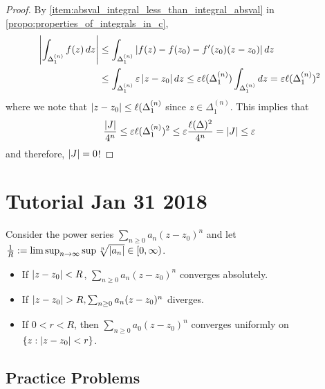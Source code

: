 \documentclass[11pt, oneside]{book}
\begin{document}
\begin{proof}
	By \cref{item:absval_integral_less_than_integral_absval} in \cref{propo:properties_of_integrals_in_c},
	\begin{align*}
		\left|\int_{\Delta_1^{(n)}} f(z) \mathop{}\!d{z}\right|
			&\leq \int_{\Delta_1^{(n)}} \left|f(z) - f(z_0) - f'(z_0)(z - z_0)\right| \mathop{}\!d{z} \\
			&\leq \int_{\Delta_1^{(n)}} \varepsilon \left|z - z_0\right| \mathop{}\!d{z} \leq \varepsilon \ell(\Delta_1^{(n)})\int_{\Delta_1^{(n)}} \mathop{}\!d{z} = \varepsilon \ell(\Delta_1^{(n)})^2
	\end{align*}
	where we note that $\left|z - z_0\right| \leq \ell(\Delta_1^{(n)}$ since $z \in \Delta_1^{(n)}$. This implies that
	\begin{align*}
		\frac{\left|J\right|}{4^n} \leq \varepsilon \ell(\Delta_1^{(n)})^2 \leq \varepsilon \frac{\ell(\Delta)^2}{4^n} = \left|J\right| \leq \varepsilon
	\end{align*}
	and therefore, $\left|J\right| = 0$!
\end{proof}	




\chapter*{Tutorial Jan 31 2018}

\begin{note}
	Consider the power series $\sum_{n \geq 0} a_n (z - z_0)^n$ and let $\frac{1}{R} := \limsup_{n \to \infty} \sup \sqrt[n]{\left|a_n\right|} \in [0, \infty)$.
	\begin{itemize}
		\item If $\left|z - z_0\right| < R$, $\sum_{n \geq 0} a_n (z - z_0)^n$ converges absolutely.
		\item If $\left|z - z_0\right| > R, \sum_{n \geq 0} a_n (z - z_0)^n$ diverges.
		\item If $0 < r < R$, then $\sum_{n \geq 0} a_0 (z - z_0)^n$ converges uniformly on $\{z : \left|z - z_0\right| < r\}$.
	\end{itemize}
\end{note}

\section{Practice Problems} %
\label{sec:practice_problems}
\end{document}
